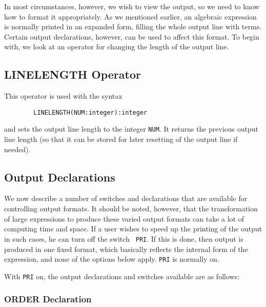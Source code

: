 In most circumstances, however, we wish to view the output, so we need to
know how to format it appropriately.  As we mentioned earlier, an
algebraic expression is normally printed in an expanded form, filling the
whole output line with terms.  Certain output declarations, however, can be used to affect this format.  To begin with,
we look at an operator for changing the length of the output line.

\subsection{LINELENGTH Operator}

This operator is used with the syntax
\begin{verbatim}
        LINELENGTH(NUM:integer):integer
\end{verbatim}
and sets the output line length to the integer {\tt NUM}. It returns the
previous output line length (so that it can be stored for later resetting
of the output line if needed).

\subsection{Output Declarations}

We now describe a number of switches and declarations that are available
for controlling output formats. It should be noted, however, that the
transformation of large expressions to produce these varied output formats
can take a lot of computing time and space. If a user wishes to speed up
the printing of the output in such cases, he can turn off the switch {\tt
PRI}. If this is done, then output is produced in one fixed
format, which basically reflects the internal form of the expression, and
none of the options below apply. {\tt PRI} is normally on.

With {\tt PRI} on, the output declarations
and switches available are as follows:

\subsubsection{ORDER Declaration}

